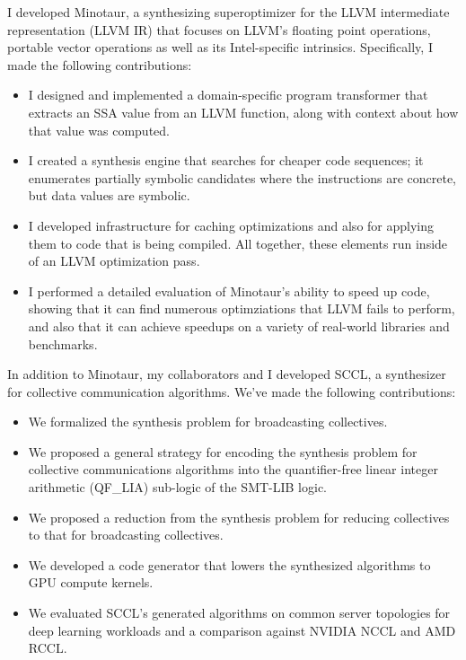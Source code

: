 I developed Minotaur, a synthesizing superoptimizer for the LLVM
intermediate representation (LLVM IR) that focuses on LLVM's floating
point operations, portable vector operations as well as its
Intel-specific intrinsics. Specifically, I made the following
contributions:

\begin{itemize}
\item I designed and implemented a domain-specific program
transformer that extracts an SSA value from an LLVM function,
along with context about how that value was computed.

\item I created a synthesis engine that searches for cheaper code
sequences; it enumerates partially symbolic candidates where the
instructions are concrete, but data values are symbolic.

\item I developed infrastructure for caching optimizations and also
for applying them to code that is being compiled.
%
All together, these elements run inside of an LLVM optimization pass.

\item I performed a detailed evaluation of Minotaur's ability to
speed up code, showing that it can find numerous optimziations that
LLVM fails to perform, and also that it can achieve speedups on a
variety of real-world libraries and benchmarks.
\end{itemize}

In addition to Minotaur, my collaborators and I developed SCCL, a
synthesizer for collective communication algorithms. We've made the
following contributions:

\begin{itemize}
\item We formalized the synthesis problem for broadcasting
collectives.

\item We proposed a general strategy for encoding the synthesis
problem for collective communications algorithms into the
quantifier-free linear integer arithmetic (QF\_LIA) sub-logic of the
SMT-LIB logic.

\item We proposed a reduction from the synthesis problem for reducing collectives
to that for broadcasting collectives.

\item We developed a code generator that lowers the synthesized algorithms
to GPU compute kernels.

\item We evaluated SCCL's generated algorithms on common server
topologies for deep learning workloads and a comparison against NVIDIA NCCL
and AMD RCCL.

\end{itemize}

